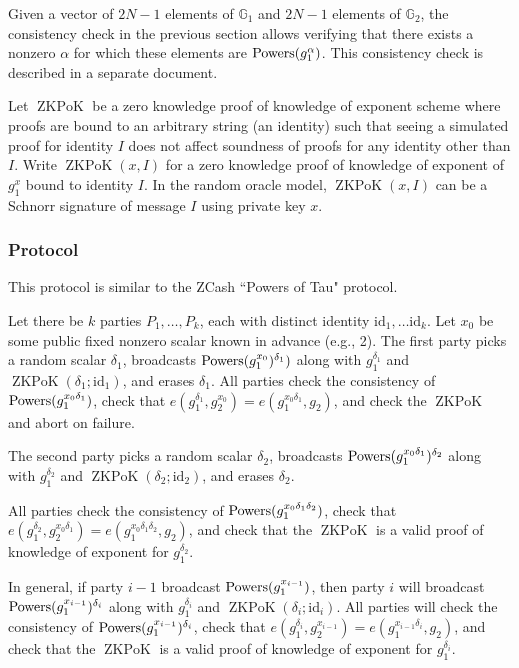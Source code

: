 \documentclass{article}
\newcommand{\G}{\mathbb{G}}
\newcommand{\?}{\stackrel{?}{=}}
\begin{document}
Given a vector of $2N-1$ elements of $\G_1$ and $2N-1$ elements of $\G_2$, the consistency check in the previous section allows verifying that there exists a nonzero $\alpha$ for which these elements are $\mathrm{Powers}(g_1^\alpha)$. This consistency check is described in a separate document.

\newcommand{\ZKPoK}{\operatorname{ZKPoK}}
\newcommand{\id}{\mathrm{id}}

Let $\ZKPoK$ be a zero knowledge proof of knowledge of exponent scheme where proofs are bound to an arbitrary string (an identity) such that seeing a simulated proof for identity $I$ does not affect soundness of proofs for any identity other than $I$. Write $\ZKPoK(x, I)$ for a zero knowledge proof of knowledge of exponent of $g_1^x$ bound to identity $I$. 
In the random oracle model, $\ZKPoK(x, I)$ can be a Schnorr signature of message $I$ using private key $x$.

\subsubsection*{Protocol}
This protocol is similar to the ZCash ``Powers of Tau" protocol.

Let there be $k$ parties $P_1, \dots, P_k$, each with distinct identity $\id_1, \dots \id_k$. Let $x_0$ be some public fixed nonzero scalar known in advance (e.g., 2).
The first party picks a random scalar $\delta_1$, broadcasts $\mathrm{Powers}(g_1^{x_0})^{\delta_1})$ along with $g_1^{\delta_1}$ and $\ZKPoK(\delta_1; \id_1)$, and erases $\delta_1$.
All parties check the consistency of $\mathrm{Powers}(g_1^{x_0 \delta_1})$, check that $e(g_1^{\delta_1}, g_2^{x_0}) = e(g_1^{x_0 \delta_1}, g_2)$, and check the $\ZKPoK$ and abort on failure.

The second party picks a random scalar $\delta_2$, broadcasts $\mathrm{Powers}(g_1^{x_0 \delta_1})^{\delta_2}$ along with $g_1^{\delta_2}$ and $\ZKPoK(\delta_2; \id_2)$, and erases $\delta_2$.

All parties check the consistency of $\mathrm{Powers}(g_1^{x_0 \delta_1 \delta_2})$, check that $e(g_1^{\delta_2}, g_2^{x_0 \delta_1}) = e(g_1^{x_0 \delta_1 \delta_2}, g_2)$, and check that the $\ZKPoK$ is a valid proof of knowledge of exponent for $g_1^{\delta_2}$.

In general, if party $i-1$ broadcast $\mathrm{Powers}(g_1^{x_{i-1}})$, then party $i$ will broadcast $\mathrm{Powers}(g_1^{x_{i-1}})^{\delta_i}$ along with $g_1^{\delta_i}$ and $\ZKPoK(\delta_i; \id_i)$. All parties will check the consistency of $\mathrm{Powers}(g_1^{x_{i-1}})^{\delta_i}$, check that $e(g_1^{\delta_i}, g_2^{x_{i-1}}) = e(g_1^{x_{i-1} \delta_i}, g_2)$, and check that the $\ZKPoK$ is a valid proof of knowledge of exponent for $g_1^{\delta_i}$.
\end{document}
